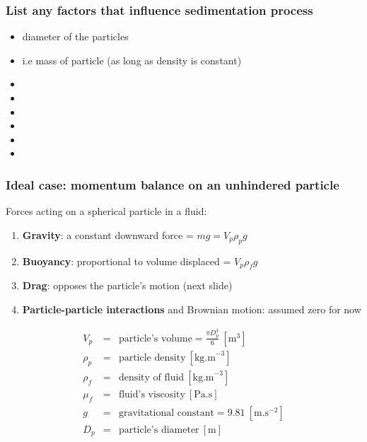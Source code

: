 \begin{frame}\frametitle{List any factors that influence sedimentation process}
	\begin{itemize}
		\item	diameter of the particles
		\item	i.e mass of particle (as long as density is constant)
		\pause
		\item	\iftoggle{instructor}{strength of gravitational field}{}
		\item	\iftoggle{instructor}{relative density of particle vs fluid}{}
		\item	\iftoggle{instructor}{density of fluid}{}
		\item	\iftoggle{instructor}{viscosity of fluid}{}
		\item	\iftoggle{instructor}{particle concentration (hindered)}{}
		\item	\iftoggle{instructor}{{\color{myRed}{no effect}}: diameter of the vessel}{}
	\end{itemize}
\end{frame}

\begin{frame}\frametitle{Ideal case: momentum balance on an unhindered particle}	
	Forces acting on a spherical particle in a fluid:
	\begin{enumerate}
		\item	\textbf{Gravity}: a constant downward force = $mg = V_p \rho_p g$		
		\item	\textbf{Buoyancy}: proportional to volume displaced = $V_p \rho_f g$
		\item	\textbf{Drag}: opposes the particle's motion (next slide)
		\item	\textbf{Particle-particle interactions} and Brownian motion: assumed zero for now
	\end{enumerate}	
	\[
		\begin{array}{rcl}
			V_p		&=& \text{particle's volume} = \displaystyle \frac{\pi D_p^3}{6} ~[\text{m}^3]\\
			\rho_p 	&=& \text{particle density}~[\text{kg.m}^{-3}]\\
			\rho_f  &=& \text{density of fluid}~[\text{kg.m}^{-3}]\\
			\mu_f   &=& \text{fluid's viscosity}~[\text{Pa.s}]\\
			g		&=& \text{gravitational constant} = 9.81~[\text{m.s}^{-2}] \\
			D_p 	&=& \text{particle's diameter}~[\text{m}]
		\end{array}
	\]
\end{frame}

